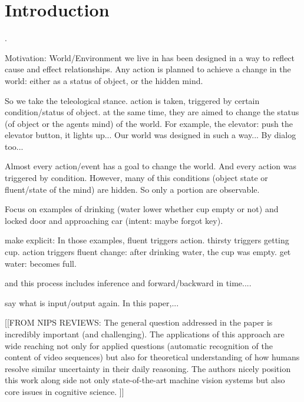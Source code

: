\documentclass[10pt,journal,letterpaper,compsoc]{IEEEtran}
\begin{document}
\IEEEdisplaynotcompsoctitleabstractindextext


\IEEEpeerreviewmaketitle

\section{Introduction}


.  


Motivation: World/Environment we live in has been designed in a way to reflect cause and effect relationships.  Any action is planned to achieve a change in the world: either as a status of object, or the hidden mind.  

So we take the teleological stance.  action is taken, triggered by certain condition/status of object.  at the same time, they are aimed to change the status (of object or the agents mind) of the world.  For example, the elevator: push the elevator button, it lights up...  Our world was designed in such a way...  By dialog too... 

Almost every action/event has a goal to change the world.  And every action was triggered by condition.  However, many of this conditions (object state or fluent/state of the mind) are hidden.  So only a portion are observable.  



Focus on examples of drinking (water lower whether cup empty or not) and locked door and approaching car (intent: maybe forgot key).


make explicit: In those examples, fluent triggers action.  thirsty triggers getting cup.  action triggers fluent change: after drinking water, the cup was empty.  get water: becomes full.

and this process includes inference and forward/backward in time....


say what is input/output again.  In this paper,...




[[FROM NIPS REVIEWS: The general question addressed in the paper is incredibly important (and challenging). The applications of this approach are wide reaching not only for applied questions (automatic recognition of the content of video sequences) but also for theoretical understanding of how humans resolve similar uncertainty in their daily reasoning. The authors nicely position this work along side not only state-of-the-art machine vision systems but also core issues in cognitive science. ]]
\end{document}
